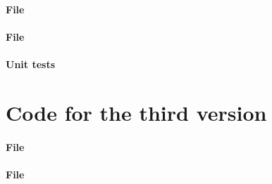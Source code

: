 \paragraph{File }


\paragraph{File }


\paragraph{Unit tests}





\section{Code for the third version}
\label{app:third}

\paragraph{File }


\paragraph{File }

